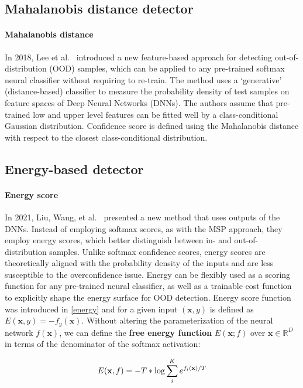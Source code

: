 \subsection{Mahalanobis distance detector}
\paragraph{Mahalanobis distance}
In 2018, Lee et al.~\cite{leeSimpleUnifiedFramework2018} introduced a new feature-based approach for detecting out-of-distribution (OOD) samples, which can be applied to any pre-trained softmax neural classifier without requiring to re-train.
The method uses a `generative' (distance-based) classifier to measure the probability density of test samples on feature spaces of Deep Neural Networks (DNNs). 
The authors assume that pre-trained low and upper level features can be fitted well by a class-conditional Gaussian distribution. 
Confidence score is defined using the Mahalanobis distance with respect to the closest class-conditional distribution. 

\subsection{Energy-based detector}
\paragraph{Energy score}
In 2021, Liu, Wang, et al.~\cite{liuEnergybasedOutofdistributionDetection2021} presented a new method that uses outputs of the DNNs. 
Instead of employing softmax scores, as with the MSP approach, they employ energy scores, 
which better distinguish between in- and out-of-distribution samples. 
Unlike softmax confidence scores, energy scores are theoretically aligned with the probability density 
of the inputs and are less susceptible to the overconfidence issue. 
Energy can be flexibly used as a scoring function for any pre-trained neural classifier, as well as a trainable cost function to explicitly shape the energy surface for OOD detection.
Energy score function was introduced in \autoref{energy} and for a given input 
$(\mathbf{x}, y)$ is defined as $E(\mathbf{x}, y) = -f_y (\mathbf{x})$. 
Without altering the parameterization of the neural network $f(\mathbf{x})$, we can define the \textbf{free energy function} $E(\mathbf{x}; f)$ over $\mathbf{x} \in \mathbb{R}^D$  in terms of the denominator of the softmax activation:

\begin{equation}
\centering
E(\mathbf{x}, f) = - T * \log{\sum_{i}^{K}{e^{f_i(\mathbf{x})/T}}}
\end{equation}

